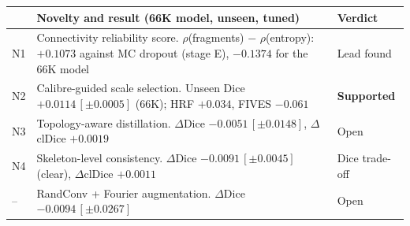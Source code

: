 \begin{tabular}{l p{4.5cm} p{1.5cm}}
\toprule
 & Novelty and result (66K model, unseen, tuned) & Verdict \\
\midrule
N1 & Connectivity reliability score. $\rho$(fragments) $-$ $\rho$(entropy): $+0.1073$ against MC dropout (stage E), $\ensuremath{-}0.1374$ for the 66K model & Lead found \\
N2 & Calibre-guided scale selection. Unseen Dice $+0.0114\,[\pm0.0005]$ (66K); HRF $+0.034$, FIVES $\ensuremath{-}0.061$ & \textbf{Supported} \\
N3 & Topology-aware distillation. $\Delta$Dice $\ensuremath{-}0.0051\,[\pm0.0148]$, $\Delta$clDice $+0.0019$ & Open \\
N4 & Skeleton-level consistency. $\Delta$Dice $\ensuremath{-}0.0091\,[\pm0.0045]$ (clear), $\Delta$clDice $+0.0011$ & Dice trade-off \\
-- & RandConv + Fourier augmentation. $\Delta$Dice $\ensuremath{-}0.0094\,[\pm0.0267]$ & Open \\
\bottomrule
\end{tabular}